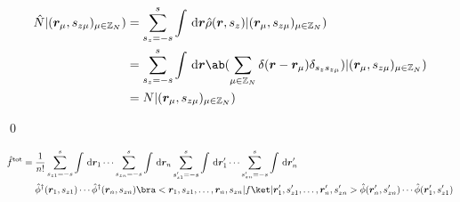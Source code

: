 \documentclass[uplatex,dvipdfmx,a4paper,11pt]{jlreq}
\makeatletter
\newcommand{\ZZ}{\mathbb{Z}}
\newcommand{\rr}{\bm{r}}
\numberwithin{equation}{section}
\theoremstyle{definition}
\renewenvironment{proof}[1][\proofname]{\par
  \normalfont
  \topsep6\p@\@plus6\p@ \trivlist
  \item[\hskip\labelsep{\bfseries #1}\@addpunct{\bfseries}]\ignorespaces\quad\par
}{
  \qed\endtrivlist\@endpefalse
}
\renewcommand\proofname{証明}
\makeatother
\begin{document}
\begin{proof}
\begin{align}
  \end{align}
  \begin{align}
    \hat{N}|(\rr_\mu, s_{z\mu})_{\mu\in\ZZ_N}) & = \sum_{s_z = -s}^{s}\int\dl{\rr}\hat{\rho}(\rr, s_z)|(\rr_\mu, s_{z\mu})_{\mu\in\ZZ_N})                                             \\
                                               & = \sum_{s_z = -s}^{s}\int\dl{\rr}\ab(\sum_{\mu\in\ZZ_N}\delta(\rr - \rr_\mu)\delta_{s_zs_{z\mu}})|(\rr_\mu, s_{z\mu})_{\mu\in\ZZ_N}) \\
                                               & = N|(\rr_\mu, s_{z\mu})_{\mu\in\ZZ_N})
  \end{align}
\end{proof}

\begin{theorem}
  \begin{align}
    \hat{f}^{\mathrm{tot}} & = \frac{1}{n!}\sum_{s_{z1} = -s}^s\int\dl{\rr_1}\cdots\sum_{s_{zn} = -s}^s\int\dl{\rr_n}\sum_{s_{z1}' = -s}^s\int\dl{\rr_1'}\cdots\sum_{s_{zn}' = -s}^s\int\dl{\rr_n'}                                                       \\
                           & \quad\ \hat{\phi}^\dagger(\rr_1, s_{z1})\cdots\hat{\phi}^\dagger(\rr_n, s_{zn})\bra<\rr_1,s_{z1},\ldots,\rr_n,s_{zn}|f\ket|\rr_1',s_{z1}',\ldots,\rr_n',s_{zn}'>\hat{\phi}(\rr_n', s_{zn}')\cdots\hat{\phi}(\rr_1', s_{z1}')
  \end{align}
\end{theorem}
\end{document}
